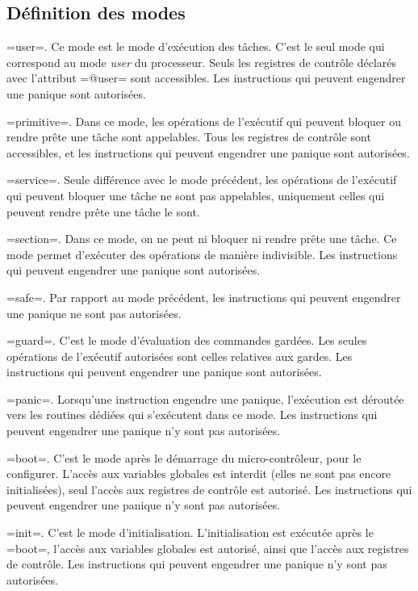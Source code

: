 \subsection{Définition des modes}

\omnibus=user=. Ce mode est le mode d'exécution des tâches. C'est le seul mode qui correspond au mode \emph{user} du processeur. Seuls les registres de contrôle déclarés avec l'attribut \omnibus=@user= sont accessibles. Les instructions qui peuvent engendrer une panique sont autorisées.

\omnibus=primitive=. Dans ce mode, les opérations de l'exécutif qui peuvent bloquer ou rendre prête une tâche sont appelables. Tous les registres de contrôle sont accessibles, et les instructions qui peuvent engendrer une panique sont autorisées.

\omnibus=service=. Seule différence avec le mode précédent, les opérations de l'exécutif qui peuvent bloquer une tâche ne sont pas appelables, uniquement celles qui peuvent rendre prête une tâche le sont.

\omnibus=section=. Dans ce mode, on ne peut ni bloquer ni rendre prête une tâche. Ce mode permet d'exécuter des opérations de manière indivisible. Les instructions qui peuvent engendrer une panique sont autorisées.

\omnibus=safe=. Par rapport au mode précédent, les instructions qui peuvent engendrer une panique ne sont pas autorisées.

\omnibus=guard=. C'est le mode d'évaluation des commandes gardées. Les seules opérations de l'exécutif autorisées sont celles relatives aux gardes. Les instructions qui peuvent engendrer une panique sont autorisées.

\omnibus=panic=. Lorsqu'une instruction engendre une panique, l'exécution est déroutée vers les routines dédiées qui s'exécutent dans ce mode.  Les instructions qui peuvent engendrer une panique n'y sont pas autorisées.

\omnibus=boot=. C'est le mode après le démarrage du micro-contrôleur, pour le configurer. L'accès aux variables globales est interdit (elles ne sont pas encore initialisées), seul l'accès aux registres de contrôle est autorisé. Les instructions qui peuvent engendrer une panique n'y sont pas autorisées.


\omnibus=init=. C'est le mode d'initialisation. L'initialisation est exécutée après le \omnibus=boot=, l'accès aux variables globales est autorisé, ainsi que l'accès aux registres de contrôle. Les instructions qui peuvent engendrer une panique n'y sont pas autorisées.














